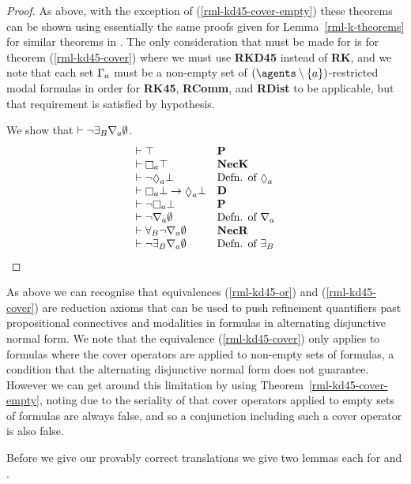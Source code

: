 \begin{proof}
As above, with the exception of (\ref{rml-kd45-cover-empty}) these theorems can be shown using essentially the same proofs given for Lemma~\ref{rml-k-theorems} for similar theorems in \axiomRmlK{}.
The only consideration that must be made for \axiomRmlKD{} is for theorem (\ref{rml-kd45-cover}) where we must use {\bf RKD45} instead of {\bf RK}, and we note that each set $\Gamma_a$ must be a non-empty set of $(\agents \setminus \{\agentA\})$-restricted modal formulas in order for {\bf RK45}, {\bf RComm}, and {\bf RDist} to be applicable, but that requirement is satisfied by hypothesis.

We show that $\vdash \lnot {\exists_{B}} \nabla_{a} \emptyset$.
$$
\begin{array}{ll}
    \proves \top & {\bf P}\\
    \proves \necessaryA \top & {\bf NecK}\\
    \proves \lnot \possibleA \bot & \text{Defn. of $\possibleA$}\\
    \proves \necessaryA \bot \implies \possibleA \bot & {\bf D}\\
    \proves \lnot \necessaryA \bot & {\bf P}\\
    \proves \lnot \coversA \emptyset & \text{Defn. of $\coversA$}\\
    \proves \allrefsBs \lnot \coversA \emptyset & {\bf NecR}\\
    \proves \lnot \somerefsBs \coversA \emptyset & \text{Defn. of $\somerefsBs$}
\end{array}
$$
\end{proof}

As above we can recognise that equivalences (\ref{rml-kd45-or}) and (\ref{rml-kd45-cover}) are reduction axioms that can be used to push refinement quantifiers past propositional connectives and modalities in formulas in alternating disjunctive normal form.
We note that the equivalence (\ref{rml-kd45-cover}) only applies to formulas where the cover operators are applied to non-empty sets of formulas, a condition that the alternating disjunctive normal form does not guarantee.
However we can get around this limitation by using Theorem~\ref{rml-kd45-cover-empty}, noting due to the seriality of \classKD{} that cover operators applied to empty sets of formulas are always false, and so a conjunction including such a cover operator is also false.

Before we give our provably correct translations we give two lemmas each for \axiomRmlKFF{} and \axiomRmlKD{}.

